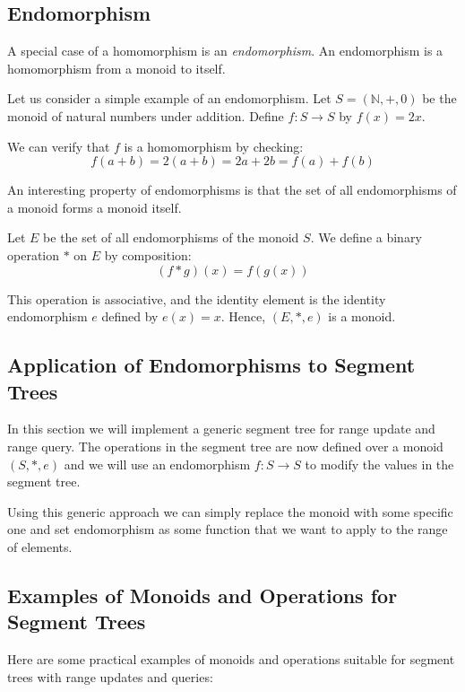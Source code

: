 \documentclass{article}
\begin{document}
\subsection{Endomorphism}

A special case of a homomorphism is an \emph{endomorphism}.  
An endomorphism is a homomorphism from a monoid to itself.

Let us consider a simple example of an endomorphism.  
Let \( S = (\mathbb{N}, +, 0) \) be the monoid of natural numbers under addition.  
Define \( f: S \to S \) by \( f(x) = 2x \).

We can verify that \( f \) is a homomorphism by checking:
\[
    f(a + b) = 2(a + b) = 2a + 2b = f(a) + f(b)
\]

An interesting property of endomorphisms is that the set of all endomorphisms of a monoid forms a monoid itself.

Let \( E \) be the set of all endomorphisms of the monoid \( S \).  
We define a binary operation \( \ast \) on \( E \) by composition:
\[
    (f \ast g)(x) = f(g(x))
\]

This operation is associative, and the identity element is the identity endomorphism \( e \) defined by \( e(x) = x \).  
Hence, \( (E, \ast, e) \) is a monoid.

\subsection{Application of Endomorphisms to Segment Trees}
In this section we will implement a generic segment tree for range update and range query.
The operations in the segment tree are now defined over a monoid \( (S, \ast, e) \) and we will use an endomorphism \( f: S \to S \) to modify the values in the segment tree.



\vspace{0.1cm}
\FloatBarrier
Using this generic approach we can simply replace the monoid with some specific one and
set endomorphism as some function that we want to apply to the range of elements.

\subsection{Examples of Monoids and Operations for Segment Trees}

Here are some practical examples of monoids and operations suitable for segment trees with range updates and queries:
\end{document}
